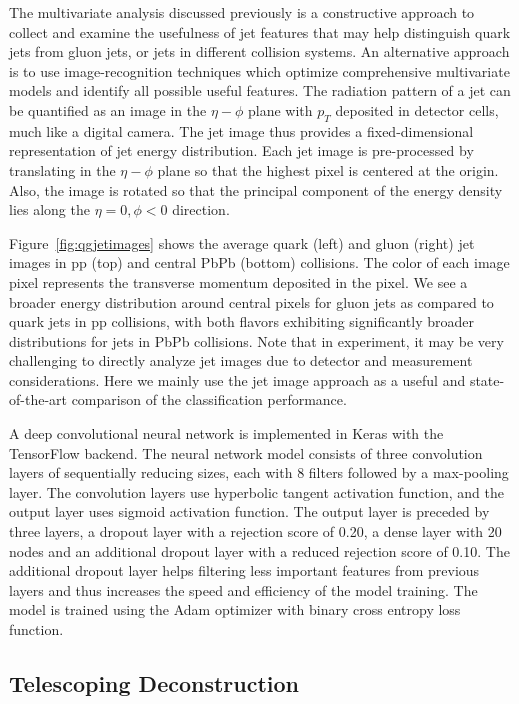 \documentclass[notoc]{JHEP3}
\begin{document}
The multivariate analysis discussed previously is a constructive approach to collect and examine the usefulness of jet features that may help distinguish quark jets from gluon jets, or jets in different collision systems. An alternative approach is to use image-recognition techniques which optimize comprehensive multivariate models and identify all possible useful features. The radiation pattern of a jet can be quantified as an image in the $\eta-\phi$ plane with $p_T$ deposited in detector cells, much like a digital camera. The jet image thus provides a fixed-dimensional representation of jet energy distribution. Each jet image is pre-processed \cite{deOliveira:2015xxd} by translating in the $\eta-\phi$ plane so that the highest pixel is centered at the origin. Also, the image is rotated so that the principal component of the energy density lies along the $\eta=0, \phi<0$ direction.

Figure~\ref{fig:qgjetimages} shows the average quark (left) and gluon (right) jet images in pp (top) and central PbPb (bottom) collisions. The color of each image pixel represents the transverse momentum deposited in the pixel. We see a broader energy distribution around central pixels for gluon jets as compared to quark jets in pp collisions, with both flavors exhibiting significantly broader distributions for jets in PbPb collisions. Note that in experiment, it may be very challenging to directly analyze jet images due to detector and measurement considerations. Here we mainly use the jet image approach as a useful and state-of-the-art comparison of the classification performance.
	
A deep convolutional neural network is implemented in Keras with the TensorFlow \cite{DBLP:journals/corr/AbadiBCCDDDGIIK16} backend. The neural network model consists of three convolution layers of sequentially reducing sizes, each with 8 filters followed by a max-pooling layer. The convolution layers use hyperbolic tangent activation function, and the output layer uses sigmoid activation function. The output layer is preceded by three layers, a dropout layer with a rejection score of 0.20, a dense layer with 20 nodes and an additional dropout layer with a reduced rejection score of 0.10. The additional dropout layer helps filtering less important features from previous layers and thus increases the speed and efficiency of the model training. The model is trained using the Adam optimizer with binary cross entropy loss function.
	
\subsection{Telescoping Deconstruction}
\label{sec:tjet}
\end{document}
